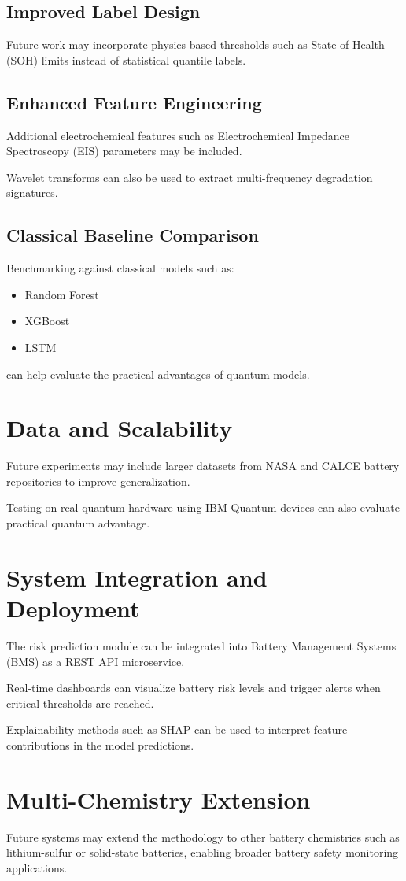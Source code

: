\subsection{Improved Label Design}

Future work may incorporate physics-based thresholds such as State of Health (SOH) limits instead of statistical quantile labels.

\subsection{Enhanced Feature Engineering}

Additional electrochemical features such as Electrochemical Impedance Spectroscopy (EIS) parameters may be included.

Wavelet transforms can also be used to extract multi-frequency degradation signatures.

\subsection{Classical Baseline Comparison}

Benchmarking against classical models such as:

\begin{itemize}
\item Random Forest
\item XGBoost
\item LSTM
\end{itemize}

can help evaluate the practical advantages of quantum models.

\section{Data and Scalability}

Future experiments may include larger datasets from NASA and CALCE battery repositories to improve generalization.

Testing on real quantum hardware using IBM Quantum devices can also evaluate practical quantum advantage.

\section{System Integration and Deployment}

The risk prediction module can be integrated into Battery Management Systems (BMS) as a REST API microservice.

Real-time dashboards can visualize battery risk levels and trigger alerts when critical thresholds are reached.

Explainability methods such as SHAP can be used to interpret feature contributions in the model predictions.

\section{Multi-Chemistry Extension}

Future systems may extend the methodology to other battery chemistries such as lithium-sulfur or solid-state batteries, enabling broader battery safety monitoring applications.